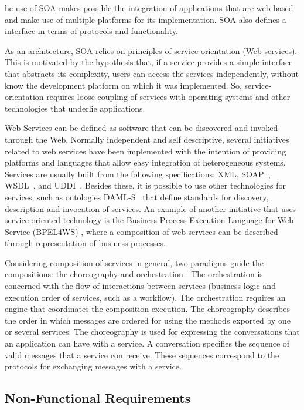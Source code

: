 {he use of SOA makes possible the integration of applications that are web based and
make use of multiple platforms for its implementation. SOA also defines a
interface in terms of protocols and functionality.
 
As an architecture, SOA relies on principles of service-orientation (Web
services). This is motivated by the hypothesis that, if a service provides a
simple interface that abstracts its complexity, users can access the services independently, without
know the development platform on which it was implemented.
So, service-orientation requires loose coupling of services with operating
systems and other technologies that underlie applications.

Web Services can be defined as software that can be discovered and invoked
through the Web. Normally independent and self descriptive, several initiatives
related to web services have been implemented with the intention of providing
platforms and languages that allow easy integration of heterogeneous systems.
Services are usually built from the following specifications: XML,
SOAP~\cite{soap}, WSDL~\cite{wsdl}, and UDDI~\cite{uddi}. Besides these, it is
possible to use other technologies for services, such as ontologies
DAML-S~\cite{Liu04} that define standards for discovery, description and
invocation of services. An example of another initiative that uses service-oriented technology is the Business Process Execution Language for Web Service (BPEL4WS) \cite{bpel,bpmn,bpm}, where a composition of web services
can be described through representation of business processes.

Considering composition of services in
general, two paradigms guide the compositions: the
choreography and orchestration \cite{SBS04}.
The orchestration is concerned with the flow of interactions between services
(business logic and execution order of services, such as a workflow). 
The orchestration requires an  engine that coordinates the composition
execution. The choreography describes the order in which messages are ordered
for using the methods exported by one or several services. The choreography is
used for expressing the conversations that an application can have with a
service. A conversation specifies the sequence of valid messages that a service
con receive. These sequences correspond to the protocols for exchanging messages
with a service. 
 

\subsection{Non-Functional Requirements}

}
